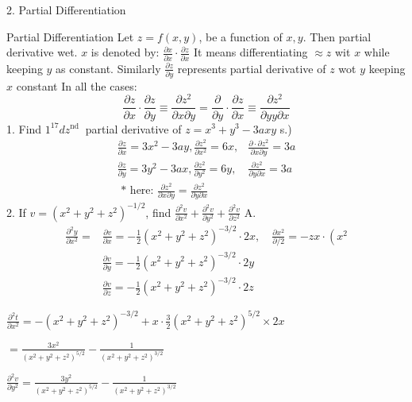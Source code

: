 \documentclass[12pt, a4paper]{article}
\begin{document}
2.
Partial Differentiation

Partial Differentiation
Let $z=f(x, y)$, be a function of $x, y$. Then partial derivative wet. $x$ is denoted by: $\frac{\partial x}{\partial x} \cdot \frac{\partial z}{\partial x}$ It means differentiating $\approx z$ wit $x$ while keeping $y$ as constant.
Similarly $\frac{\partial z}{\partial y}$ represents partial derivative of $z$ wot $y$ keeping $x$ constant
In all the cases:
$$
\frac{\partial z}{\partial x} \cdot \frac{\partial z}{\partial y} \equiv \frac{\partial z^2}{\partial x \partial y}=\frac{\partial}{\partial y} \cdot \frac{\partial z}{\partial x} \equiv \frac{\partial z^2}{\partial y y \partial x}
$$
1. Find $1^{17} d z^{\text {nd }}$ partial derivative of $z=x^3+y^3-3 a x y$
s.)
$$
\begin{array}{ll}
\frac{\partial z}{\partial x}=3 x^2-3 a y, \frac{\partial z^2}{\partial x^2}=6 x, & \frac{\partial \cdot \partial z^2}{\partial x \partial y}=3 a \\
\frac{\partial z}{\partial y}=3 y^2-3 a x, \frac{\partial z^2}{\partial y^2}=6 y, & \frac{\partial z^2}{\partial y \partial x}=3 a \\
\text { * here: } \frac{\partial z^2}{\partial x \partial y}=\frac{\partial z^2}{\partial y \partial x}
\end{array}
$$
2. If $v=\left(x^2+y^2+z^2\right)^{-1 / 2}$, find $\frac{\partial^2 v}{\partial x^2}+\frac{\partial^2 v}{\partial y^2}+\frac{\partial^2 v}{\partial z^2}$
A.
$$
\begin{aligned}
\frac{\partial^2 y}{\partial x^2}= & \frac{\partial v}{\partial x}=-\frac{1}{2}\left(x^2+y^2+z^2\right)^{-3 / 2} \cdot 2 x, \quad \frac{\partial x^2}{\partial / 2}=-z x \cdot\left(x^2\right. \\
& \frac{\partial v}{\partial y}=-\frac{1}{2}\left(x^2+y^2+z^2\right)^{-3 / 2} \cdot 2 y \\
& \frac{\partial v}{\partial z}=-\frac{1}{2}\left(x^2+y^2+z^2\right)^{-3 / 2} \cdot 2 z
\end{aligned}
$$

$\frac{\partial^{2} t}{\partial x^{2}}=-\left(x^{2}+y^{2}+z^{2}\right)^{-3 / 2}+x \cdot \frac{3}{2}\left(x^{2}+y^{2}+z^{2}\right)^{5 / 2} \times 2 x$

$=\frac{3 x^{2}}{\left(x^{2}+y^{2}+z^{2}\right)^{5 / 2}}-\frac{1}{\left(x^{2}+y^{2}+z^{2}\right)^{3 / 2}}$

$\frac{\partial^{2} v}{\partial y^{2}}=\frac{3 y^{2}}{\left(x^{2}+y^{2}+z^{2}\right)^{5 / 2}}-\frac{1}{\left(x^{2}+y^{2}+z^{2}\right)^{3 / 2}}$
\end{document}
